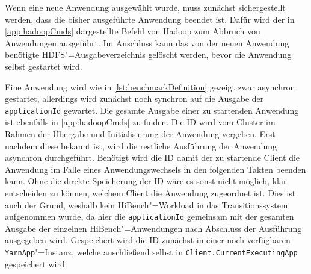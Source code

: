 Wenn eine neue Anwendung ausgewählt wurde, muss zunächst sichergestellt werden, dass die bisher ausgeführte Anwendung beendet ist. Dafür wird der in \autoref{app:hadoopCmds} dargestellte Befehl von Hadoop zum Abbruch von Anwendungen ausgeführt. Im Anschluss kann das von der neuen Anwendung benötigte \ac{HDFS}"=Ausgabeverzeichnis gelöscht werden, bevor die Anwendung selbst gestartet wird.

Eine Anwendung wird wie in \autoref{lst:benchmarkDefinition} gezeigt zwar asynchron gestartet, allerdings wird zunächst noch synchron auf die Ausgabe der \texttt{applicationId} gewartet. Die gesamte Ausgabe einer zu startenden Anwendung ist ebenfalls in \autoref{app:hadoopCmds} zu finden. Die ID wird vom Cluster im Rahmen der Übergabe und Initialisierung der Anwendung vergeben. Erst nachdem diese bekannt ist, wird die restliche Ausführung der Anwendung asynchron durchgeführt. Benötigt wird die ID damit der zu startende Client die Anwendung im Falle eines Anwendungswechsels in den folgenden Takten beenden kann. Ohne die direkte Speicherung der ID wäre es sonst nicht möglich, klar entscheiden zu können, welchem Client die Anwendung zugeordnet ist. Dies ist auch der Grund, weshalb kein HiBench"=Workload in das Transitionssystem aufgenommen wurde, da hier die \texttt{applicationId} gemeinsam mit der gesamten Ausgabe der einzelnen HiBench"=Anwendungen nach Abschluss der Ausführung ausgegeben wird. Gespeichert wird die ID zunächst in einer noch verfügbaren \texttt{YarnApp}"=Instanz, welche anschließend selbst in \texttt{Client.CurrentExecutingApp} gespeichert wird.